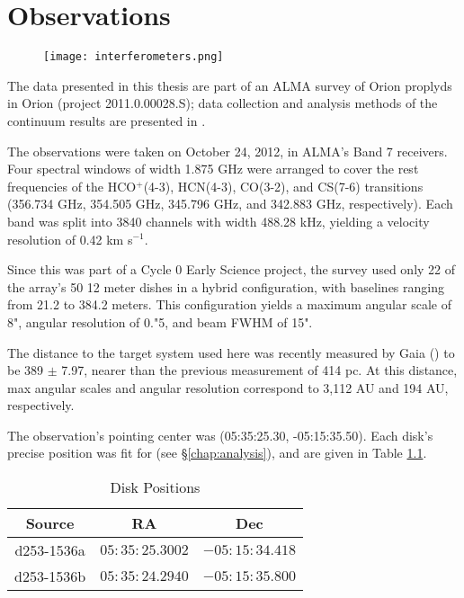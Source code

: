 \chapter{Observations}
\label{chap:observations}


\begin{figure}[b]
  \centering
  \texttt{[image: interferometers.png]}
  \label{fig:interferometers}
\end{figure}




The data presented in this thesis are part of an ALMA survey of Orion proplyds in Orion (project 2011.0.00028.S); data collection and analysis methods of the continuum results are presented in \citet{Mann2014}.

The observations were taken on October 24, 2012, in ALMA's Band 7 receivers. Four spectral windows of width 1.875 GHz were arranged to cover the rest frequencies of the HCO$^+$(4-3), HCN(4-3), CO(3-2), and CS(7-6) transitions (356.734 GHz, 354.505 GHz, 345.796 GHz, and 342.883 GHz, respectively). Each band was split into 3840 channels with width 488.28 kHz, yielding a velocity resolution of 0.42 km s$^{-1}$.

Since this was part of a Cycle 0 Early Science project, the survey used only 22 of the array's 50 12 meter dishes in a hybrid configuration, with baselines ranging from 21.2 to 384.2 meters. This configuration yields a maximum angular scale of 8", angular resolution of 0."5, and beam FWHM of 15".

The distance to the target system used here was recently measured by Gaia (\citep{GaiaCollaboration2018,GaiaCollaboration2018}) to be 389 $\pm$ 7.97, nearer than the previous measurement of 414 pc. At this distance, max angular scales and angular resolution correspond to 3,112 AU and 194 AU, respectively.

The observation's pointing center was (05:35:25.30, -05:15:35.50). Each disk's precise position was fit for (see \S\ref{chap:analysis}), and are given in Table \ref{table:disk_positions}.


\begin{table}
  \centering
  \caption{Disk Positions}
  \label{table:disk_positions}
  \renewcommand{\arraystretch}{1.2}
  \begin{tabular}{c | c | c }
    \toprule \toprule
      Source      &  RA            & Dec \\
    \midrule %
      d253-1536a  &  $05:35:25.3002$ & $-05:15:34.418$  \\
      d253-1536b  &  $05:35:24.2940$ & $-05:15:35.800$  \\
    \bottomrule
  \end{tabular}
\end{table}

